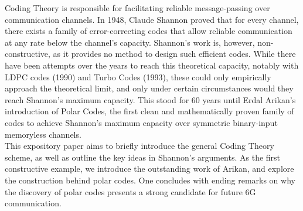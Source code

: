 
Coding Theory is responsible for facilitating reliable message-passing over communication channels. In 1948, Claude Shannon proved that for every channel, there exists a family of error-correcting codes that allow reliable communication at any rate below the channel's capacity. Shannon's work is, however, non-constructive, as it provides no method to design such efficient codes. While there have been attempts over the years to reach this theoretical capacity, notably with LDPC codes (1990) and Turbo Codes (1993), these could only empirically approach the theoretical limit, and only under certain circumstances would they reach Shannon's maximum capacity. This stood for 60 years until Erdal Arikan's introduction of Polar Codes, the first clean and mathematically proven family of codes to achieve Shannon's maximum capacity over symmetric binary-input memoryless channels. \\[6pt]

This expository paper aims to briefly introduce the general Coding Theory scheme, as well as outline the key ideas in Shannon's arguments. As the first constructive example, we introduce the outstanding work of Arikan, and explore the construction behind polar codes. One concludes with ending remarks on why the discovery of polar codes presents a strong candidate for future 6G communication.